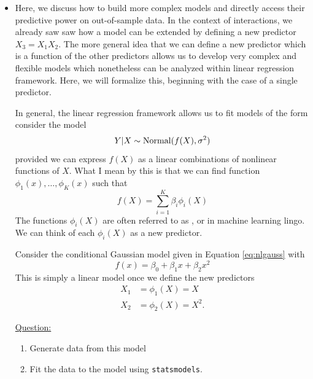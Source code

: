 \begin{itemize}
\item Here, we discuss how to build more complex models and directly access their predictive power on out-of-sample data.  %
In the context of interactions, we already saw saw how a model can be extended by defining a new predictor $X_3 = X_1X_2$. The more general idea that we can define a new predictor which is a function of the other predictors allows us to develop very complex and flexible models which nonetheless can be analyzed within linear regression framework. Here, we will formalize this, beginning with the case of a single predictor. 

In general, the linear regression framework allows us to fit models of the form consider the model
\begin{equation}\label{eq:nlgauss}
Y|X \sim {\rm Normal}( f(X),\sigma^2)
\end{equation}
provided we can express $f(X)$ as a linear combinations of nonlinear functions of $X$. What I mean by this is that we can find function $\phi_1(x),\dots,\phi_K(x)$ such that 
\begin{equation*}
f(X) = \sum_{i=1}^K \beta_i\phi_i(X)
\end{equation*}
The functions $\phi_i(X)$ are often referred to as , or  in machine learning lingo. We can think of each $\phi_i(X)$ as a new predictor. 



\begin{example}

Consider the conditional Gaussian model given in Equation \ref{eq:nlgauss} with 
\begin{equation*}
f(x) = \beta_0+\beta_1x + \beta_2x^2
\end{equation*}
 This is simply a linear model once we define the new predictors 
\begin{align*}
X_1 &= \phi_1(X) = X\\
X_2 &= \phi_2(X) = X^2. 
\end{align*}


\noindent
\underline{Question:}
\begin{enumerate}[label=(\alph*)]
\item Generate data from this model
\item Fit the data to the model using \verb!statsmodels!.\\
\end{enumerate}


\end{example}
\end{itemize}
